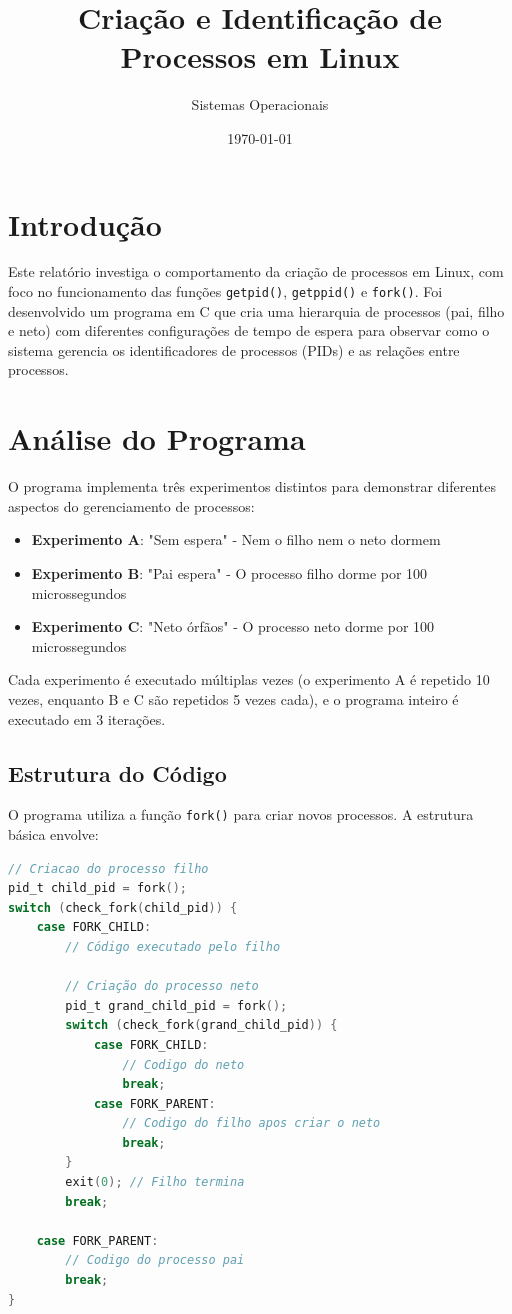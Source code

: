 \documentclass[12pt]{article}
\title{Criação e Identificação de Processos em Linux}
\author{Sistemas Operacionais}
\date{\today}
\begin{document}
\maketitle

\section{Introdução}

Este relatório investiga o comportamento da criação de processos em Linux, com foco no funcionamento das funções \texttt{getpid()}, \texttt{getppid()} e \texttt{fork()}. Foi desenvolvido um programa em C que cria uma hierarquia de processos (pai, filho e neto) com diferentes configurações de tempo de espera para observar como o sistema gerencia os identificadores de processos (PIDs) e as relações entre processos.

\section{Análise do Programa}

O programa implementa três experimentos distintos para demonstrar diferentes aspectos do gerenciamento de processos:

\begin{itemize}
    \item \textbf{Experimento A}: "Sem espera" - Nem o filho nem o neto dormem
    \item \textbf{Experimento B}: "Pai espera" - O processo filho dorme por 100 microssegundos
    \item \textbf{Experimento C}: "Neto órfãos" - O processo neto dorme por 100 microssegundos
\end{itemize}

Cada experimento é executado múltiplas vezes (o experimento A é repetido 10 vezes, enquanto B e C são repetidos 5 vezes cada), e o programa inteiro é executado em 3 iterações.

\subsection{Estrutura do Código}

O programa utiliza a função \texttt{fork()} para criar novos processos. A estrutura básica envolve:

\begin{lstlisting}[language=C]
// Criacao do processo filho
pid_t child_pid = fork();
switch (check_fork(child_pid)) {
    case FORK_CHILD:
        // Código executado pelo filho
        
        // Criação do processo neto
        pid_t grand_child_pid = fork();
        switch (check_fork(grand_child_pid)) {
            case FORK_CHILD:
                // Codigo do neto
                break;
            case FORK_PARENT:
                // Codigo do filho apos criar o neto
                break;
        }
        exit(0); // Filho termina
        break;
        
    case FORK_PARENT:
        // Codigo do processo pai
        break;
}
\end{lstlisting}
\end{document}
